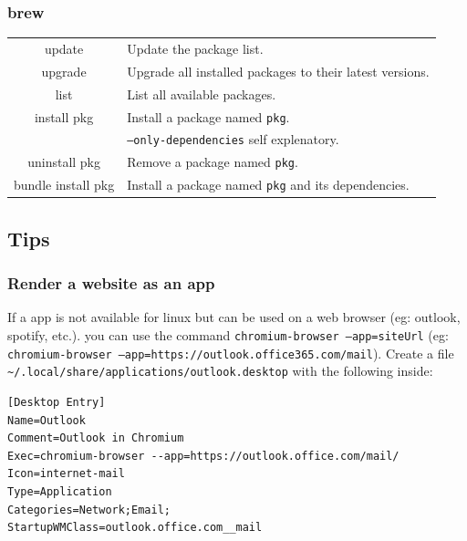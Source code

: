 \documentclass[10pt]{article}
\begin{document}
\begin{multicols}{2}
\subsubsection{brew}
\begin{tabular}{C L}
    update              & Update the package list. \\
    upgrade             & Upgrade all installed packages to their latest versions. \\
    list                & List all available packages. \\
    install pkg         & Install a package named \texttt{pkg}. \\
                        & \texttt{--only-dependencies} self explenatory.\\
    uninstall pkg       & Remove a package named \texttt{pkg}. \\
    bundle install pkg  & Install a package named \texttt{pkg} and its dependencies. \\
\end{tabular}

\subsection{Tips}
\subsubsection{Render a website as an app}
If a app is not available for linux but can be used on a web browser (eg: outlook, spotify, etc.). you can use the command \texttt{chromium-browser --app=siteUrl}
(eg: \texttt{chromium-browser --app=https://outlook.office365.com/mail}). Create a file \texttt{\textasciitilde/.local/share/applications/outlook.desktop} with the following inside:
\begin{verbatim}
[Desktop Entry]
Name=Outlook
Comment=Outlook in Chromium
Exec=chromium-browser --app=https://outlook.office.com/mail/
Icon=internet-mail
Type=Application
Categories=Network;Email;
StartupWMClass=outlook.office.com__mail
\end{verbatim}
\end{multicols}
\end{document}
